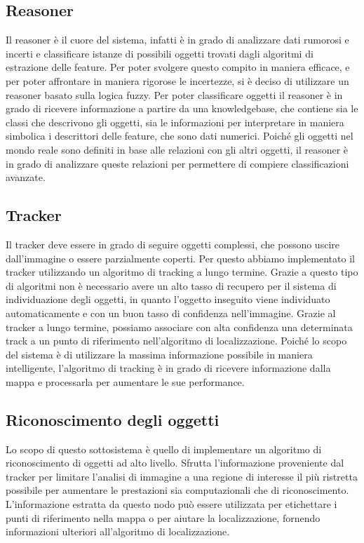\subsection{Reasoner}
Il reasoner è il cuore del sistema, infatti è in grado di analizzare dati rumorosi e incerti e classificare istanze di possibili oggetti trovati dagli algoritmi di estrazione delle feature. Per poter svolgere questo compito in maniera efficace, e per poter affrontare in maniera rigorose le incertezze, si è deciso di utilizzare un reasoner basato sulla logica fuzzy.
Per poter classificare oggetti il reasoner è in grado di ricevere informazione a partire da una knowledgebase, che contiene sia le classi che descrivono gli oggetti, sia le informazioni per interpretare in maniera simbolica i descrittori delle feature, che sono dati numerici. 
Poiché gli oggetti nel mondo reale sono definiti in base alle relazioni con gli altri oggetti, il reasoner è in grado di analizzare queste relazioni per permettere di compiere classificazioni avanzate.

\subsection{Tracker}
Il tracker deve essere in grado di seguire oggetti complessi, che possono uscire dall'immagine o essere parzialmente coperti. Per questo abbiamo implementato il tracker utilizzando un algoritmo di tracking a lungo termine. Grazie a questo tipo di algoritmi non è necessario avere un alto tasso di recupero per il sistema di individuazione degli oggetti, in quanto l'oggetto inseguito viene individuato automaticamente e con un buon tasso di confidenza nell'immagine. Grazie al tracker a lungo termine, possiamo associare con alta confidenza una determinata track a un punto di riferimento nell'algoritmo di localizzazione.
Poiché lo scopo del sistema è di utilizzare la massima informazione possibile in maniera intelligente, l'algoritmo di tracking è in grado di ricevere informazione dalla mappa e processarla per aumentare le sue performance.


\subsection{Riconoscimento degli oggetti}
Lo scopo di questo sottosistema è quello di implementare un algoritmo di riconoscimento di oggetti ad alto livello. Sfrutta l'informazione proveniente dal tracker per limitare l'analisi di immagine a una regione di interesse il più ristretta possibile per aumentare le prestazioni sia computazionali che di riconoscimento. L'informazione estratta da questo nodo può essere utilizzata per etichettare i punti di riferimento nella mappa o per aiutare la localizzazione, fornendo informazioni ulteriori all'algoritmo di localizzazione.

